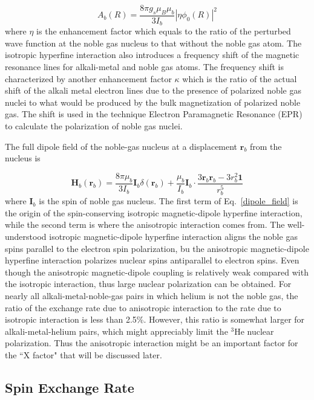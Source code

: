 \begin{equation}
A_{b}(R)=\frac{8\pi g_{s}\mu_{B}\mu_{b}}{3I_{b}}|\eta \phi_{0}(R)|^{2}
\end{equation}
where $\eta$ is the enhancement factor which equals to the ratio of the perturbed wave function at the noble gas nucleus to that without the noble gas atom. The isotropic hyperfine interaction also introduces a frequency shift of the magnetic resonance lines for alkali-metal and noble gas atoms. The frequency shift is characterized by another enhancement factor $\kappa$ which is the ratio of the actual shift of the alkali metal electron lines due to the presence of polarized noble gas nuclei to what would be produced by the bulk magnetization of polarized noble gas. The shift is used in the technique Electron Paramagnetic Resonance (EPR) to calculate the polarization of noble gas nuclei.

The full dipole field of the noble-gas nucleus at a displacement $\boldsymbol{r}_b$ from the nucleus is~\cite{PhysRevA.58.3642}

\begin{equation}\label{dipole_field}
\boldsymbol{H}_b(\boldsymbol{r}_b)=\frac{8\pi \mu_b}{3I_b}\boldsymbol{I}_b\delta(\boldsymbol{r}_b) + \frac{\mu_b}{I_b}\boldsymbol{I}_b\cdot \frac{3\boldsymbol{r}_b \boldsymbol{r}_b-3r_b^2\boldsymbol{1}}{r_b^5}
\end{equation}
where $\boldsymbol{I}_b$ is the spin of noble gas nucleus. The first term of Eq.~\ref{dipole_field} is the origin of the spin-conserving isotropic magnetic-dipole hyperfine interaction, while the second term is where the anisotropic interaction comes from. The well-understood isotropic magnetic-dipole hyperfine interaction aligns the noble gas spins parallel to the electron spin polarization, bu the anisotropic magnetic-dipole hyperfine interaction polarizes nuclear spins antiparallel to electron spins. Even though the anisotropic magnetic-dipole coupling is relatively weak compared with the isotropic interaction, thus large nuclear polarization can be obtained. For nearly all alkali-metal-noble-gas pairs in which helium is not the noble gas, the ratio of the exchange rate due to anisotropic interaction to the rate due to isotropic interaction is less than 2.5\%. However, this ratio is somewhat larger for alkali-metal-helium pairs, which might appreciably limit the $^{3}$He nuclear polarization. Thus the anisotropic interaction might be an important factor for the ``X factor" that will be discussed later.

\subsection{Spin Exchange Rate}

